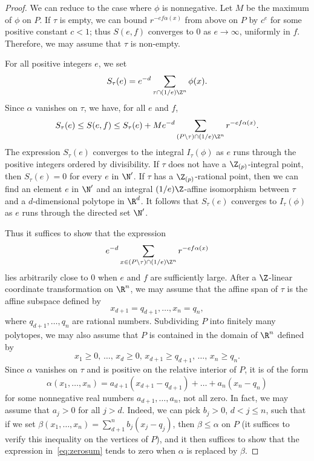 \begin{proof}
We can reduce to the case where $\phi$ is nonnegative. Let $M$ be the maximum of $\phi$ on $P$.
If $\tau $ is empty, we can bound $r^{-ef\alpha(x)}$ from above on $P$ by $c^e$ for some positive constant $c<1$; thus $S(e,f)$ converges to $0$ as $e\to \infty$, uniformly in $f$. Therefore, we may assume that $\tau$ is non-empty.

For all positive integers $e$, we set
\[
S_{\tau}(e)=e^{-d}\sum_{\tau\cap (1/e)\Z^n}\phi(x).
\]
Since $\alpha$ vanishes on $\tau$, we have, for all $e$ and $f$,
\[
S_{\tau}(e) \leq S(e,f)\leq S_{\tau}(e)+ Me^{-d}\sum_{(P\setminus \tau)\cap (1/e)\Z^n}r^{-ef\alpha(x)}.
\]
The expression $S_{\tau}(e)$ converges to the integral $I_{\tau}(\phi)$ as $e$ runs through the positive integers ordered by divisibility. If $\tau$ does not have a $\Z_{(p)}$-integral point,
then $S_{\tau}(e)=0$ for every $e$ in $\N'$.
If $\tau$ has a $\Z_{(p)}$-rational point, then we can find an element $e$ in $\N'$
and an integral $(1/e)\Z$-affine isomorphism between $\tau$ and a $d$-dimensional polytope in $\R^d$.
It follows that $S_{\tau}(e)$ converges to $I_{\tau}(\phi)$ as $e$ runs through the directed set $\N'$.

Thus it suffices to show that the expression
\begin{equation}\label{eq:zerosum}
e^{-d}\sum_{x\in (P\setminus \tau)\cap (1/e)\Z^n}r^{-ef\alpha(x)}
\end{equation}
lies arbitrarily close to $0$ when $e$ and $f$ are sufficiently large.
After a $\Z$-linear coordinate transformation on $\R^n$, we may assume that the affine span of $\tau$ is the affine subspace defined by
\[
x_{d+1}=q_{d+1},\ldots,x_n=q_n,
\]
where $q_{d+1},\ldots,q_n$ are rational numbers. Subdividing $P$ into finitely many polytopes, we may also assume that $P$ is contained in the domain of $\R^n$ defined by
\[
x_1\geq 0,\,\ldots,\,x_d\geq 0,\,x_{d+1}\geq q_{d+1},\,\ldots,\,x_n\geq q_n.
\]
Since $\alpha$ vanishes on $\tau$ and is positive on the relative interior of $P$, it is of the form
\[
\alpha(x_1,\ldots,x_n)=a_{d+1}(x_{d+1}-q_{d+1})+\ldots+ a_{n}(x_{n}-q_{n})
\]
for some nonnegative real numbers $a_{d+1},\ldots,a_n$, not all zero.
In fact, we may assume that $a_j>0$ for all $j>d$. Indeed, we can pick $b_j>0$, $d<j\le n$, such that if we set $\beta(x_1,\dots,x_n)=\sum_{d+1}^nb_j(x_j-q_j)$, then $\beta\le\alpha$ on $P$ (it suffices to verify this inequality on the vertices of $P$), and it then suffices to show that the expression in~\eqref{eq:zerosum} tends to zero when $\alpha$ is replaced by $\beta$.


\end{proof}
